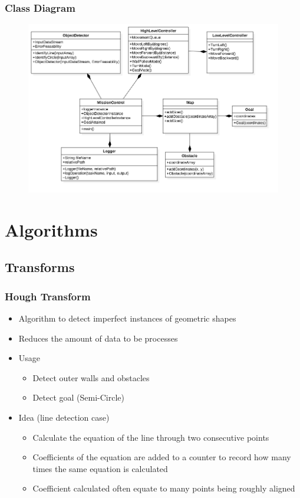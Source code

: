 \documentclass{beamer}
\begin{document}
\begin{frame}
\frametitle{Class Diagram}
\begin{figure}[H]
\centering
\includegraphics[scale=0.34]{assets/diagrams/ClassDiagram.png}
\end{figure}
\end{frame}

\section{Algorithms}
\subsection{Transforms}
\begin{frame}
\frametitle{Hough Transform}
\begin{itemize}
\item Algorithm to detect imperfect instances of geometric shapes
\item Reduces the amount of data to be processes
\item Usage
\begin{itemize}
\item Detect outer walls and obstacles
\item Detect goal (Semi-Circle)
\end{itemize}
\item Idea (line detection case)
\begin{itemize}
\item Calculate the equation of the line through two consecutive points
\item Coefficients of the equation are added to a counter to record how many times the same equation is calculated
\item Coefficient calculated often equate to many points being roughly aligned	
\end{itemize}
\end{itemize}
\end{frame}
\end{document}
